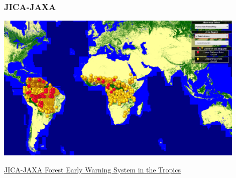 \begin{frame}
  \frametitle{ JICA-JAXA }
 \begin{center}
 \includegraphics[width=0.9\textwidth,keepaspectratio=true]{./images/jjfast.png}
\end{center} 

\href{http://www.eorc.jaxa.jp/jjfast/}{JICA-JAXA Forest Early Warning System in the Tropics }
\end{frame}

